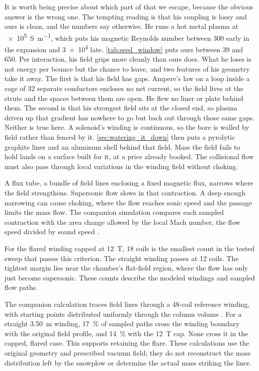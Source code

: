\documentclass{article}
\begin{document}
It is worth being precise about which part of that we escape, because the obvious answer is the wrong one. The tempting reading is that his coupling is lossy and ours is clean, and the numbers say otherwise. He runs a hot metal plasma at \SI{e5}{\siemens\per\meter}, which puts his magnetic Reynolds number between \num{300} early in the expansion and \num{3e4} late. \autoref{tab:seed_window} puts ours between \num{39} and \num{650}. Per interaction, his field grips more cleanly than ours does. What he loses is not energy per bounce but the chance to leave, and two features of his geometry take it away. The first is that his field has gaps. Ampere's law on a loop inside a cage of 32 separate conductors encloses no net current, so the field lives at the struts and the spaces between them are open. He flew no liner or plate behind them. The second is that his strongest field sits at the closed end, so plasma driven up that gradient has nowhere to go but back out through those same gaps. Neither is true here. A solenoid's winding is continuous, so the bore is walled by field rather than fenced by it. \autoref{sec:watering_it_down} then puts a pyrolytic graphite liner and an aluminum shell behind that field. Mass the field fails to hold lands on a surface built for it, at a price already booked. The collisional flow must also pass through local variations in the winding field without choking.

A flux tube, a bundle of field lines enclosing a fixed magnetic flux, narrows where the field strengthens. Supersonic flow slows in that contraction. A deep enough narrowing can cause choking, where the flow reaches sonic speed and the passage limits the mass flow. The companion simulation compares each sampled contraction with the area change allowed by the local Mach number, the flow speed divided by sound speed \cite{Katz_puffsat_impact_sim_2026}.

For the flared winding capped at \SI{12}{\tesla}, 18 coils is the smallest count in the tested sweep that passes this criterion. The straight winding passes at 12 coils. The tightest margin lies near the chamber's flat-field region, where the flow has only just become supersonic. These counts describe the modeled windings and sampled flow paths.

The companion calculation traces field lines through a 48-coil reference winding, with starting points distributed uniformly through the column volume \cite{Katz_puffsat_impact_sim_2026}. For a straight \SI{3.50}{\meter} winding, \SI{17}{\percent} of sampled paths cross the winding boundary with the original field profile, and \SI{14}{\percent} with the \SI{12}{\tesla} cap. None cross it in the capped, flared case. This supports retaining the flare. These calculations use the original geometry and prescribed vacuum field; they do not reconstruct the mass distribution left by the snowplow or determine the actual mass striking the liner.
\end{document}
